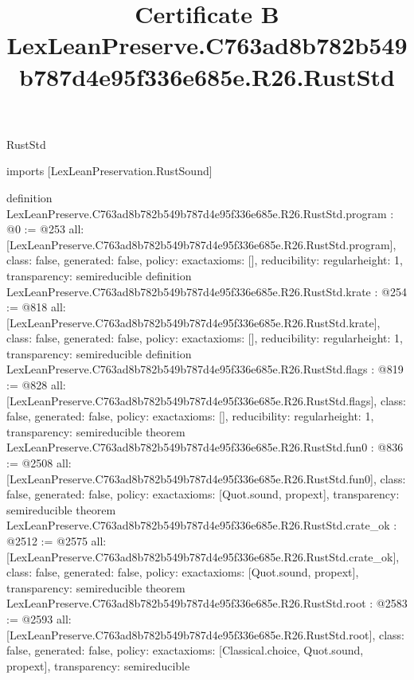 \begin{lexlean}{RustStd}
\title{Certificate B LexLeanPreserve.C763ad8b782b549b787d4e95f336e685e.R26.RustStd}
\begin{coremodule}
imports [LexLeanPreservation.RustSound]

definition LexLeanPreserve.C763ad8b782b549b787d4e95f336e685e.R26.RustStd.program : @0 := @253 {
  all: [LexLeanPreserve.C763ad8b782b549b787d4e95f336e685e.R26.RustStd.program],
  class: false,
  generated: false,
  policy: exact{axioms: []},
  reducibility: regular{height: 1},
  transparency: semireducible
}
definition LexLeanPreserve.C763ad8b782b549b787d4e95f336e685e.R26.RustStd.krate : @254 := @818 {
  all: [LexLeanPreserve.C763ad8b782b549b787d4e95f336e685e.R26.RustStd.krate],
  class: false,
  generated: false,
  policy: exact{axioms: []},
  reducibility: regular{height: 1},
  transparency: semireducible
}
definition LexLeanPreserve.C763ad8b782b549b787d4e95f336e685e.R26.RustStd.flags : @819 := @828 {
  all: [LexLeanPreserve.C763ad8b782b549b787d4e95f336e685e.R26.RustStd.flags],
  class: false,
  generated: false,
  policy: exact{axioms: []},
  reducibility: regular{height: 1},
  transparency: semireducible
}
theorem LexLeanPreserve.C763ad8b782b549b787d4e95f336e685e.R26.RustStd.fun0 : @836 := @2508 {
  all: [LexLeanPreserve.C763ad8b782b549b787d4e95f336e685e.R26.RustStd.fun0],
  class: false,
  generated: false,
  policy: exact{axioms: [Quot.sound, propext]},
  transparency: semireducible
}
theorem LexLeanPreserve.C763ad8b782b549b787d4e95f336e685e.R26.RustStd.crate_ok : @2512 := @2575 {
  all: [LexLeanPreserve.C763ad8b782b549b787d4e95f336e685e.R26.RustStd.crate_ok],
  class: false,
  generated: false,
  policy: exact{axioms: [Quot.sound, propext]},
  transparency: semireducible
}
theorem LexLeanPreserve.C763ad8b782b549b787d4e95f336e685e.R26.RustStd.root : @2583 := @2593 {
  all: [LexLeanPreserve.C763ad8b782b549b787d4e95f336e685e.R26.RustStd.root],
  class: false,
  generated: false,
  policy: exact{axioms: [Classical.choice, Quot.sound, propext]},
  transparency: semireducible
}


\end{coremodule}
\end{lexlean}
